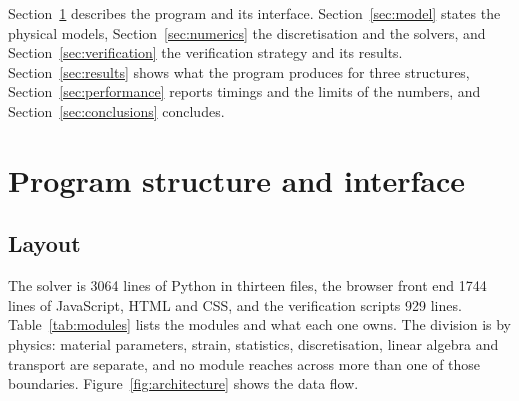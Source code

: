 \documentclass[preprint,12pt]{elsarticle}
\begin{document}
Section~\ref{sec:structure} describes the program and its interface.
Section~\ref{sec:model} states the physical models, Section~\ref{sec:numerics}
the discretisation and the solvers, and Section~\ref{sec:verification} the
verification strategy and its results. Section~\ref{sec:results} shows what
the program produces for three structures, Section~\ref{sec:performance}
reports timings and the limits of the numbers, and
Section~\ref{sec:conclusions} concludes.

\section{Program structure and interface}
\label{sec:structure}

\subsection{Layout}

The solver is \num{3064} lines of Python in thirteen files, the browser front
end \num{1744} lines of JavaScript, HTML and CSS, and the verification scripts
\num{929} lines. Table~\ref{tab:modules} lists the modules and what each one
owns. The division is by physics: material
parameters, strain, statistics, discretisation, linear algebra and transport
are separate, and no module reaches across more than one of those boundaries.
Figure~\ref{fig:architecture} shows the data flow.
\end{document}
